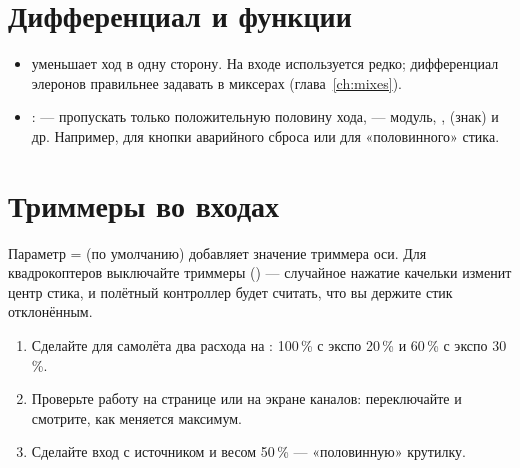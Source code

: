 \begin{center}
\end{center}

\section{Дифференциал и функции}

\begin{itemize}
  \item {} уменьшает ход в одну сторону. На входе используется редко; дифференциал
        элеронов правильнее задавать в миксерах (глава~\ref{ch:mixes}).
  \item {}:  --- пропускать только положительную половину хода,
         --- модуль, ,  (знак) и др. Например, для кнопки
        аварийного сброса или для «половинного» стика.
\end{itemize}

\section{Триммеры во входах}

Параметр  =  (по умолчанию) добавляет значение триммера оси.
Для квадрокоптеров выключайте триммеры () --- случайное нажатие качельки изменит
центр стика, и полётный контроллер будет считать, что вы держите стик отклонённым.

\begin{tasks}
\begin{enumerate}
  \item Сделайте для самолёта два расхода на : 100\,\% с экспо 20\,\% и 60\,\% с экспо 30\,\%.
  \item Проверьте работу на странице  или на экране каналов: переключайте 
        и смотрите, как меняется максимум.
  \item Сделайте вход  с источником  и весом 50\,\% --- «половинную» крутилку.
\end{enumerate}
\end{tasks}
